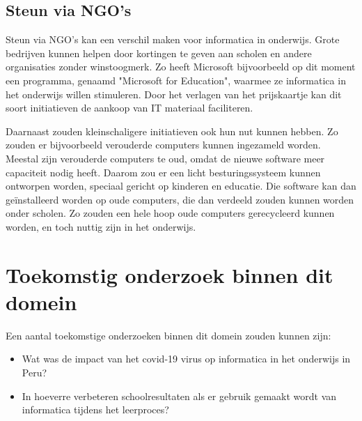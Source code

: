 \subsection{Steun via NGO's}
Steun via NGO's kan een verschil maken voor informatica in onderwijs. Grote bedrijven kunnen helpen door kortingen te geven aan scholen en andere organisaties zonder winstoogmerk. Zo heeft Microsoft bijvoorbeeld op dit moment een programma, genaamd "Microsoft for Education", waarmee ze informatica in het onderwijs willen stimuleren. Door het verlagen van het prijskaartje kan dit soort initiatieven de aankoop van IT materiaal faciliteren.


Daarnaast zouden kleinschaligere initiatieven ook hun nut kunnen hebben. Zo zouden er bijvoorbeeld verouderde computers kunnen ingezameld worden. Meestal zijn verouderde computers te oud, omdat de nieuwe software meer capaciteit nodig heeft. Daarom zou er een licht besturingssysteem kunnen ontworpen worden, speciaal gericht op kinderen en educatie. Die software kan dan geïnstalleerd worden op oude computers, die dan verdeeld zouden kunnen worden onder scholen. Zo zouden een hele hoop oude computers gerecycleerd kunnen worden, en toch nuttig zijn in het onderwijs.

\section{Toekomstig onderzoek binnen dit domein}

Een aantal toekomstige onderzoeken binnen dit domein zouden kunnen zijn: 
\begin{itemize}
	\item Wat was de impact van het covid-19 virus op informatica in het onderwijs in Peru?
	\item In hoeverre verbeteren schoolresultaten als er gebruik gemaakt wordt van informatica tijdens het leerproces?
\end{itemize}

